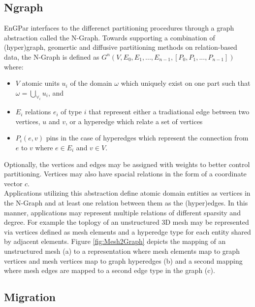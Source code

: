 \documentclass[a4paper]{article}
\begin{document}
\subsection{Ngraph}
EnGPar interfaces to the differenct partitioning procedures through a graph abstraction called the N-Graph. Towards supporting a combination of (hyper)graph, geomertic and diffusive partitioning methods on relation-based data, the N-Graph is defined as $G^n(V,E_0,E_1,...,E_{n-1},[P_0,P_1,...,P_{n-1}])$ where:
\begin{itemize}
  \item $V$ atomic units $u_i$ of the domain $\omega$ which uniquely exist on one
    part such that $\omega = \bigcup_{\forall_i}u_i$, and 
  \item $E_i$ relations $e_i$ of type $i$ that represent either a tradiational edge between two vertices, $u$ and $v$, or a hyperedge which relate a set of vertices
  \item $P_i(e,v)$ pins in the case of hyperedges which represent the connection
    from $e$ to $v$ where $e \in E_i$ and $v \in V$.
\end{itemize}
Optionally, the vertices and edges may be assigned with weights to better control partitioning. Vertices may also have spacial relations in the form of a coordinate vector $c$.\\
Applications utilizing this abstraction define atomic domain entities as vertices in the N-Graph and at least one relation between them as the (hyper)edges. In this manner, applications may represent multiple relations of different sparsity and degree. For example the toplogy of an unstructured 3D mesh may be represented via vertices defined as mesh elements and a hyperedge type for each entity shared by adjacent elements. Figure \ref{fig:Mesh2Graph} depicts the mapping of an unstructured mesh (a) to a representation where mesh elements map to graph vertices and mesh vertices map to graph hyperedges (b) and a second mapping where mesh edges are mapped to a second edge type in the graph (c).

\subsection{Migration}
\end{document}
